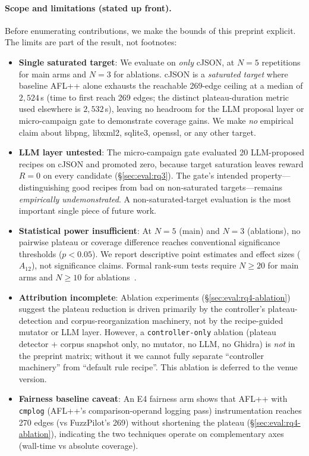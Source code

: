 \documentclass[11pt]{article}
\begin{document}
\paragraph{Scope and limitations (stated up front).} Before
enumerating contributions, we make the bounds of this preprint
explicit. The limits are part of the result, not footnotes:

\begin{itemize}
\item \textbf{Single saturated target}: We evaluate on \emph{only}
cJSON, at $N{=}5$ repetitions for main arms and $N{=}3$ for
ablations. cJSON is a \emph{saturated target} where baseline AFL++
alone exhausts the reachable 269-edge ceiling at a median of
$2{,}524$\,s (time to first reach 269 edges; the distinct
plateau-duration metric used elsewhere is $2{,}532$\,s), leaving no
headroom for the LLM proposal layer or micro-campaign gate to
demonstrate coverage gains. We make \emph{no} empirical claim about
libpng, libxml2, sqlite3, openssl, or any other target.

\item \textbf{LLM layer untested}: The micro-campaign gate evaluated
20 LLM-proposed recipes on cJSON and promoted zero, because target
saturation leaves reward $R{=}0$ on every candidate
(\S\ref{sec:eval:rq3}). The gate's intended property---distinguishing
good recipes from bad on non-saturated targets---remains
\emph{empirically undemonstrated}. A non-saturated-target evaluation
is the most important single piece of future work.

\item \textbf{Statistical power insufficient}: At $N{=}5$ (main) and
$N{=}3$ (ablations), no pairwise plateau or coverage difference
reaches conventional significance thresholds ($p{<}0.05$). We report
descriptive point estimates and effect sizes ($A_{12}$), not
significance claims. Formal rank-sum tests require $N{\geq}20$ for
main arms and $N{\geq}10$ for ablations~\cite{klees2018evaluating}.

\item \textbf{Attribution incomplete}: Ablation experiments
(\S\ref{sec:eval:rq4-ablation}) suggest the plateau reduction is
driven primarily by the controller's plateau-detection and
corpus-reorganization machinery, not by the recipe-guided mutator or
LLM layer. However, a \texttt{controller-only} ablation (plateau
detector + corpus snapshot only, no mutator, no LLM, no Ghidra) is
\emph{not} in the preprint matrix; without it we cannot fully
separate ``controller machinery'' from ``default rule recipe''. This
ablation is deferred to the venue version.

\item \textbf{Fairness baseline caveat}: An E4 fairness arm shows
that AFL++ with \texttt{cmplog} (AFL++'s comparison-operand logging
pass) instrumentation reaches 270 edges (vs FuzzPilot's 269) without
shortening the plateau (\S\ref{sec:eval:rq4-ablation}), indicating
the two techniques operate on complementary axes (wall-time vs
absolute coverage).
\end{itemize}
\end{document}
